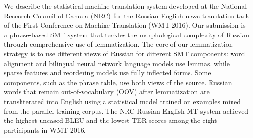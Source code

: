 We describe the statistical machine translation system developed at the National Research Council of Canada (NRC) for the Russian-English news translation task of the First Conference on Machine Translation (WMT 2016). Our submission is a phrase-based SMT system that tackles the morphological complexity of Russian through comprehensive use of lemmatization. The core of our lemmatization strategy is to use different views of Russian for different SMT components: word alignment and bilingual neural network language models use lemmas, while sparse features and reordering models use fully inflected forms. Some components, such as the phrase table, use both views of the source. Russian words that remain out-of-vocabulary (OOV) after lemmatization are transliterated into English using a statistical model trained on examples mined from the parallel training corpus. The NRC Russian-English MT system achieved the highest uncased BLEU and the lowest TER scores among the eight participants in WMT 2016.
